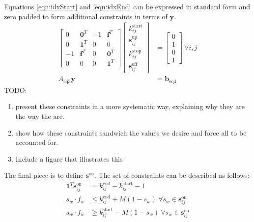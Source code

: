 Equations \ref{eqn:idxStart} and \ref{eqn:idxEnd} can be expressed in standard form and zero padded to form additional constraints in terms of $\mathbf{y}$.
\begin{equation} \begin{aligned}
	\begin{bmatrix} 0 & \mathbf{0}^T & -1 & \mathbf{f}^T \\
		        0 & \mathbf{1}^T &  0 & 0            \\
		       -1 & \mathbf{f}^T & 0 & \mathbf{0}^T  \\
		        0 & 0            & 0 & \mathbf{1}^T 
	\end{bmatrix} 
	\begin{bmatrix} k_{ij}^{\text{start}}       \\
		        \mathbf{s}_{ij}^{\text{up}} \\ 
			k_{ij}^{\text{stop}}        \\ 
			\mathbf{s}_{ij}^{\text{off}} 
	\end{bmatrix} &= 
	\begin{bmatrix} 0 \\ 
			1 \\
	                0 \\
			1
	\end{bmatrix} \ \forall i,j \\
	A_{\text{eq3}}\mathbf{y} &= \mathbf{b}_{\text{eq3}}
\end{aligned} \end{equation}
TODO:
\begin{enumerate}
	\item present these constraints in a more systematic way, explaining why they are the way the are.
	\item show how these constraints sandwich the values we desire and force all to be accounted for. 
	\item Include a figure that illustrates this
\end{enumerate}
The final piece is to define $\mathbf{s}^{\text{on}}$. The set of constraints can be described as follows: 
\begin{equation} \label{eqn:idxMiddle}\begin{aligned}
	\mathbf{1}^T\mathbf{s}^{\text{on}}_{ij} &= k^{\text{end}}_{ij} - k^{\text{start}}_{ij} - 1 \\
	s_w\cdot f_w &\le k^{\text{end}}_{ij} + M(1 - s_w) \ \forall s_w \in \mathbf{s}^{\text{on}}_{ij}\\
	s_w\cdot f_w &\ge k^{\text{start}}_{ij} - M(1 - s_w) \ \forall s_w \in \mathbf{s}^{\text{on}}_{ij}\\ 
\end{aligned} \end{equation}
